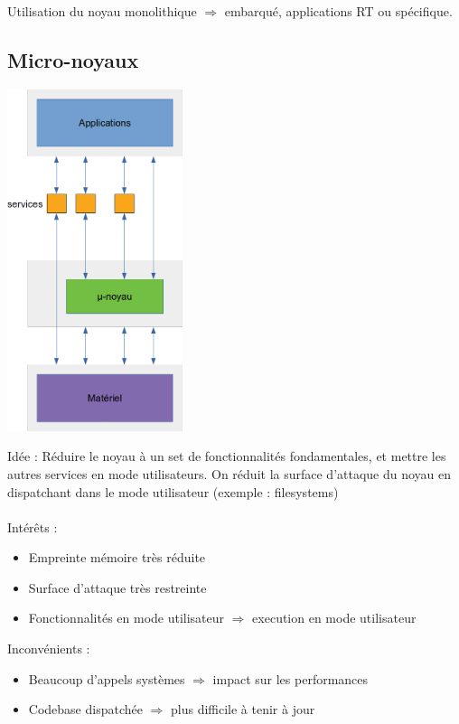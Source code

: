 Utilisation du noyau monolithique $\Rightarrow$ embarqué, applications RT ou
spécifique.

\subsection{Micro-noyaux}

\begin{center}
  \includegraphics[height=10cm]{cours1/pics/cours1_micro.png}
\end{center}
Idée : Réduire le noyau à un set de fonctionnalités fondamentales, et mettre les
autres services en mode utilisateurs. On réduit la surface d'attaque du
noyau en dispatchant dans le mode utilisateur (exemple : filesystems)\\\\
Intérêts :
\begin{itemize}
  \item Empreinte mémoire très réduite
  \item Surface d'attaque très restreinte
  \item Fonctionnalités en mode utilisateur $\Rightarrow$ execution en mode utilisateur
\end{itemize}
Inconvénients :
\begin{itemize}
  \item Beaucoup d'appels systèmes $\Rightarrow$ impact sur les performances
  \item Codebase dispatchée $\Rightarrow$ plus difficile à tenir à jour
\end{itemize}
